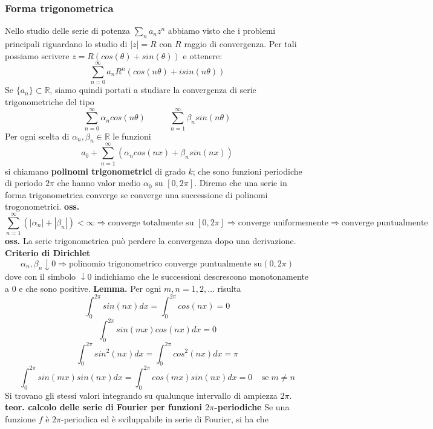 \subsubsection{Forma trigonometrica}
Nello studio delle serie di potenza $\sum_{n}a_n z^n$ abbiamo visto che i problemi principali riguardano lo studio di $|z| = R$ con $R$ raggio di convergenza. Per tali possiamo scrivere $z = R(cos(\theta) + sin(\theta))$ e ottenere:
\[
    \sum_{n=0}^{\infty} a_n R^n(cos(n \theta) + isin(n \theta))
\]
Se $\{a_n\} \subset \mathbb{R}$, siamo quindi portati a studiare la convergenza di serie trigonometriche del tipo
\[
    \sum_{n=0}^{\infty} \alpha_n cos(n \theta) \;\;\;\;\; \;\;\;\;\; \sum_{n=1}^{\infty} \beta_n sin(n \theta)
\]
Per ogni scelta di $\alpha_n, \beta_n \in \mathbb{R}$ le funzioni
\[
    a_0 + \sum_{n=1}^{\infty} (\alpha_n cos(nx) + \beta_n sin(n x))
\]
si chiamano \textbf{polinomi trigonometrici} di grado $k$; che sono funzioni periodiche di periodo $2\pi$ che hanno valor medio $\alpha_0$ su $[0, 2\pi]$.\newline
Diremo che una serie in forma trigonometrica converge se converge una successione di polinomi trogonometrici.\newline
\textbf{oss.} 
\[
    \sum_{n=1}^{\infty} (|\alpha_n| + |\beta_n|) < \infty \Rightarrow \text{converge totalmente su } [0,2\pi] \Rightarrow \text{converge uniformemente} \Rightarrow \text{converge puntualmente}
\]
\textbf{oss.} La serie trigonometrica può perdere la convergenza dopo una derivazione.\newline
\newline
\textbf{Criterio di Dirichlet}
\[
    \alpha_n, \beta_n \downarrow 0 \Rightarrow \text{polinomio trigonometrico converge puntualmente su} (0,2\pi)
\]
dove con il simbolo $\downarrow 0$ indichiamo che le successioni descrescono monotonamente a $0$ e che sono positive.\newline
\newline
\textbf{Lemma.} Per ogni $m,n = 1,2,\dots$ risulta 
\[
    \int_{0}^{2\pi} sin(nx) dx = \int_{0}^{2\pi} cos(nx) = 0
\]
\[
    \int_{0}^{2\pi} sin(mx) cos(nx) dx = 0
\]
\[
    \int_{0}^{2\pi} sin^2(nx) dx = \int_{0}^{2\pi} cos^2(nx) dx = \pi
\]
\[
    \int_{0}^{2\pi} sin(mx) sin(nx) dx = \int_{0}^{2\pi} cos(mx) sin(nx) dx = 0 \;\;\;\; \text{se} \; m\neq n
\]
Si trovano gli stessi valori integrando su qualunque intervallo di ampiezza $2\pi$.\newline
\newline
\textbf{teor. calcolo delle serie di Fourier per funzioni $2\pi$-periodiche} Se una funzione $f$ è $2\pi$-periodica ed è sviluppabile in serie di Fourier, si ha che
